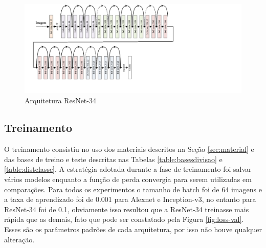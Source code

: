 \begin{figure}
\centering
\includegraphics[scale=0.83]{figuras/resnet-34.png}
\caption{Arquitetura ResNet-34}
\label{fig:resnet-34}
\end{figure}



\subsection{Treinamento}
O treinamento consistiu no uso dos materiais descritos na Seção \ref{sec:material} e das bases de treino e teste descritas nas Tabelas \ref{table:basesdivisao} e \ref{table:distclasse}. A estratégia adotada durante a fase de treinamento foi salvar vários modelos enquanto a função de perda convergia para serem utilizadas em comparações. Para todos os experimentos o tamanho de batch foi de 64 imagens e a taxa de aprendizado foi de 0.001 para Alexnet e Inception-v3, no entanto para ResNet-34 foi de 0.1, obviamente isso resultou que a ResNet-34 treinasse mais rápida que as demais, fato que pode ser constatado pela Figura \ref{fig:loss-val}. Esses são os parâmetros padrões de cada arquitetura, por isso não houve qualquer alteração. 




